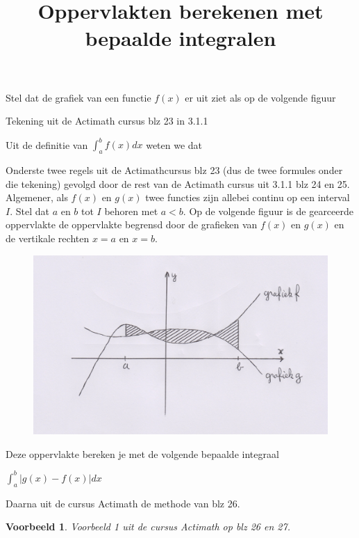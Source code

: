\documentclass{article}
\title{Oppervlakten berekenen met bepaalde integralen}
\date { }
\newtheorem*{voorbeeld}{Voorbeeld} \newtheorem*{eigenschap}{Eigenschap} \newtheorem*{opmerking}{Opmerking}
\begin{document}
\maketitle \noindent

\noindent Stel dat de grafiek van een functie $f(x)$ er uit ziet als op de volgende figuur

Tekening uit de Actimath cursus blz 23 in 3.1.1

\noindent Uit de definitie van $\int ^b_a f(x)dx$ weten we dat 

Onderste twee regels uit de Actimathcursus blz 23 (dus de twee formules onder die tekening) gevolgd door de rest van de Actimath cursus uit 3.1.1 blz 24 en 25.\\

\noindent Algemener, als $f(x)$ en $g(x)$ twee functies zijn allebei continu op een interval $I$.
Stel dat $a$ en $b$ tot $I$ behoren met $a<b$.
Op de volgende figuur is de gearceerde oppervlakte de oppervlakte begrensd door de grafieken van $f(x)$ en $g(x)$ en de vertikale rechten $x=a$ en $x=b$.

\begin{figure}[h]
\begin{center}
\includegraphics[height=5 cm]{integraal3.JPG}
\end{center}
\end{figure}

Deze oppervlakte bereken je met de volgende bepaalde integraal

$\boxed { \int^b_a \vert g(x)-f(x) \vert dx }$

Daarna uit de cursus Actimath de methode van blz 26.

\begin{voorbeeld}
Voorbeeld 1 uit de cursus Actimath op blz 26 en 27.
\end{voorbeeld}
\end{document}
